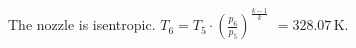 The nozzle is isentropic.  
\( T_6 = T_5 \cdot \left( \frac{p_6}{p_5} \right)^{\frac{k-1}{k}} \)  
\( = 328.07 \, \text{K} \).